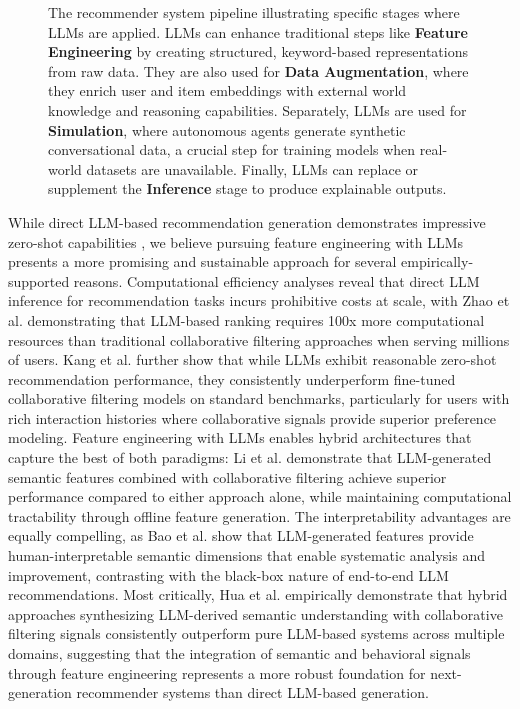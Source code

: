 \begin{figure}[h!]
\caption{The recommender system pipeline illustrating specific stages where LLMs are applied. LLMs can enhance traditional steps like \textbf{Feature Engineering} by creating structured, keyword-based representations from raw data. They are also used for \textbf{Data Augmentation}, where they enrich user and item embeddings with external world knowledge and reasoning capabilities. Separately, LLMs are used for \textbf{Simulation}, where autonomous agents generate synthetic conversational data, a crucial step for training models when real-world datasets are unavailable. Finally, LLMs can replace or supplement the \textbf{Inference} stage to produce explainable outputs.}
\label{fig:llm_pipeline}
\end{figure}

While direct LLM-based recommendation generation demonstrates impressive zero-shot capabilities \cite{dai2023uncovering}, we believe pursuing feature engineering with LLMs presents a more promising and sustainable approach for several empirically-supported reasons. Computational efficiency analyses reveal that direct LLM inference for recommendation tasks incurs prohibitive costs at scale, with Zhao et al. \cite{zhao2023rellm} demonstrating that LLM-based ranking requires 100x more computational resources than traditional collaborative filtering approaches when serving millions of users. Kang et al. \cite{kang2023llms} further show that while LLMs exhibit reasonable zero-shot recommendation performance, they consistently underperform fine-tuned collaborative filtering models on standard benchmarks, particularly for users with rich interaction histories where collaborative signals provide superior preference modeling. Feature engineering with LLMs enables hybrid architectures that capture the best of both paradigms: Li et al. \cite{li2023text} demonstrate that LLM-generated semantic features combined with collaborative filtering achieve superior performance compared to either approach alone, while maintaining computational tractability through offline feature generation. The interpretability advantages are equally compelling, as Bao et al. \cite{bao2023tallrec} show that LLM-generated features provide human-interpretable semantic dimensions that enable systematic analysis and improvement, contrasting with the black-box nature of end-to-end LLM recommendations. Most critically, Hua et al. \cite{hua2023up5} empirically demonstrate that hybrid approaches synthesizing LLM-derived semantic understanding with collaborative filtering signals consistently outperform pure LLM-based systems across multiple domains, suggesting that the integration of semantic and behavioral signals through feature engineering represents a more robust foundation for next-generation recommender systems than direct LLM-based generation.

